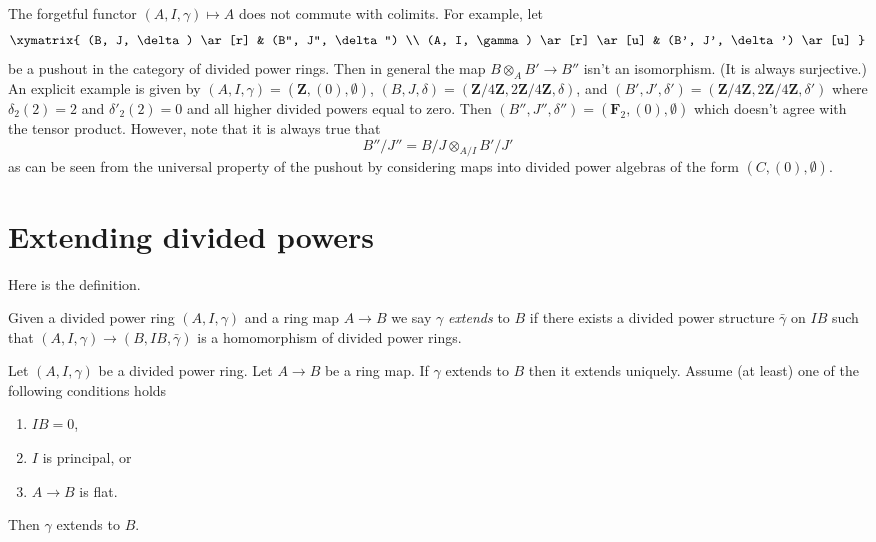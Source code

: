 \begin{remark}
\label{remark-forgetful}
The forgetful functor $(A, I, \gamma) \mapsto A$ does not commute with
colimits. For example, let
$$
\xymatrix{
(B, J, \delta) \ar[r] & (B'', J'', \delta'') \\
(A, I, \gamma) \ar[r] \ar[u] & (B', J', \delta') \ar[u]
}
$$
be a pushout in the category of divided power rings.
Then in general the map $B \otimes_A B' \to B''$ isn't an
isomorphism. (It is always surjective.)
An explicit example is given by
$(A, I, \gamma) = (\mathbf{Z}, (0), \emptyset)$,
$(B, J, \delta) = (\mathbf{Z}/4\mathbf{Z}, 2\mathbf{Z}/4\mathbf{Z}, \delta)$,
and
$(B', J', \delta') =
(\mathbf{Z}/4\mathbf{Z}, 2\mathbf{Z}/4\mathbf{Z}, \delta')$
where $\delta_2(2) = 2$ and $\delta'_2(2) = 0$ and all higher divided powers
equal to zero. Then $(B'', J'', \delta'') = (\mathbf{F}_2, (0), \emptyset)$
which doesn't agree with the tensor product. However, note that it is always
true that
$$
B''/J'' = B/J \otimes_{A/I} B'/J'
$$
as can be seen from the universal property of the pushout by considering
maps into divided power algebras of the form $(C, (0), \emptyset)$.
\end{remark}


\section{Extending divided powers}
\label{section-extend}

\noindent
Here is the definition.

\begin{definition}
\label{definition-extends}
Given a divided power ring $(A, I, \gamma)$ and a ring map
$A \to B$ we say $\gamma$ {\it extends} to $B$ if there exists a
divided power structure $\bar \gamma$ on $IB$ such that
$(A, I, \gamma) \to (B, IB, \bar\gamma)$ is a homomorphism of
divided power rings.
\end{definition}

\begin{lemma}
\label{lemma-gamma-extends}
Let $(A, I, \gamma)$ be a divided power ring.
Let $A \to B$ be a ring map.
If $\gamma$ extends to $B$ then it extends uniquely.
Assume (at least) one of the following conditions holds
\begin{enumerate}
\item $IB = 0$,
\item $I$ is principal, or
\item $A \to B$ is flat.
\end{enumerate}
Then $\gamma$ extends to $B$.
\end{lemma}

